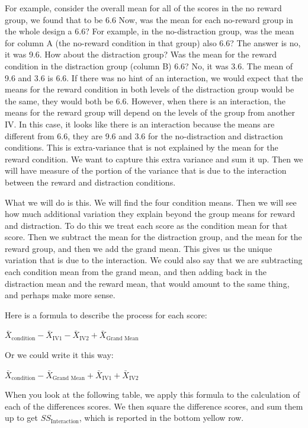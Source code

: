 \documentclass[
]{book}
\begin{document}
For example, consider the overall mean for all of the scores in the no reward group, we found that to be 6.6 Now, was the mean for each no-reward group in the whole design a 6.6? For example, in the no-distraction group, was the mean for column A (the no-reward condition in that group) also 6.6? The answer is no, it was 9.6. How about the distraction group? Was the mean for the reward condition in the distraction group (column B) 6.6? No, it was 3.6. The mean of 9.6 and 3.6 is 6.6. If there was no hint of an interaction, we would expect that the means for the reward condition in both levels of the distraction group would be the same, they would both be 6.6. However, when there is an interaction, the means for the reward group will depend on the levels of the group from another IV. In this case, it looks like there is an interaction because the means are different from 6.6, they are 9.6 and 3.6 for the no-distraction and distraction conditions. This is extra-variance that is not explained by the mean for the reward condition. We want to capture this extra variance and sum it up. Then we will have measure of the portion of the variance that is due to the interaction between the reward and distraction conditions.

What we will do is this. We will find the four condition means. Then we will see how much additional variation they explain beyond the group means for reward and distraction. To do this we treat each score as the condition mean for that score. Then we subtract the mean for the distraction group, and the mean for the reward group, and then we add the grand mean. This gives us the unique variation that is due to the interaction. We could also say that we are subtracting each condition mean from the grand mean, and then adding back in the distraction mean and the reward mean, that would amount to the same thing, and perhaps make more sense.

Here is a formula to describe the process for each score:

\(\bar{X}_\text{condition} -\bar{X}_\text{IV1} - \bar{X}_\text{IV2} + \bar{X}_\text{Grand Mean}\)

Or we could write it this way:

\(\bar{X}_\text{condition} - \bar{X}_\text{Grand Mean} + \bar{X}_\text{IV1} + \bar{X}_\text{IV2}\)

When you look at the following table, we apply this formula to the calculation of each of the differences scores. We then square the difference scores, and sum them up to get \(SS_\text{Interaction}\), which is reported in the bottom yellow row.
\end{document}
